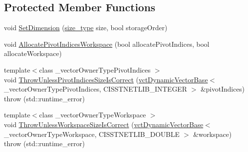 \subsection*{Protected Member Functions}
\begin{DoxyCompactItemize}
\item 
void \hyperlink{classnmr_inverse_dynamic_data_a054d4de772b71ab8da045f070f00aa1a}{Set\+Dimension} (\hyperlink{classnmr_inverse_dynamic_data_aeb5c2317adf50d8fc7952a9b38bf0129}{size\+\_\+type} size, bool storage\+Order)
\item 
void \hyperlink{classnmr_inverse_dynamic_data_accb38be41c1792e06d5d97748990682c}{Allocate\+Pivot\+Indices\+Workspace} (bool allocate\+Pivot\+Indices, bool allocate\+Workspace)
\item 
{\footnotesize template$<$class \+\_\+vector\+Owner\+Type\+Pivot\+Indices $>$ }\\void \hyperlink{classnmr_inverse_dynamic_data_a25f183e2ef43867ea19f98422818abb5}{Throw\+Unless\+Pivot\+Indices\+Size\+Is\+Correct} (\hyperlink{classvct_dynamic_vector_base}{vct\+Dynamic\+Vector\+Base}$<$ \+\_\+vector\+Owner\+Type\+Pivot\+Indices, C\+I\+S\+S\+T\+N\+E\+T\+L\+I\+B\+\_\+\+I\+N\+T\+E\+G\+E\+R $>$ \&pivot\+Indices)  throw (std\+::runtime\+\_\+error)
\item 
{\footnotesize template$<$class \+\_\+vector\+Owner\+Type\+Workspace $>$ }\\void \hyperlink{classnmr_inverse_dynamic_data_ae330256d35b7e69cb5e39532b92365ed}{Throw\+Unless\+Workspace\+Size\+Is\+Correct} (\hyperlink{classvct_dynamic_vector_base}{vct\+Dynamic\+Vector\+Base}$<$ \+\_\+vector\+Owner\+Type\+Workspace, C\+I\+S\+S\+T\+N\+E\+T\+L\+I\+B\+\_\+\+D\+O\+U\+B\+L\+E $>$ \&workspace)  throw (std\+::runtime\+\_\+error)
\end{DoxyCompactItemize}
